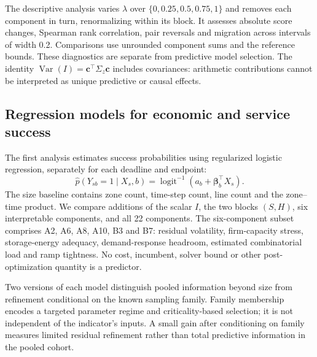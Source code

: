 The descriptive analysis varies $\lambda$ over $\{0,0.25,0.5,0.75,1\}$ and
removes each component in turn, renormalizing within its block. It assesses
absolute score changes, Spearman rank correlation, pair reversals and
migration across intervals of width 0.2. Comparisons use unrounded component
sums and the reference bounds. These diagnostics are separate from
predictive model selection. The identity
$\operatorname{Var}(I)=\boldsymbol c^\top\Sigma_z\boldsymbol c$ includes
covariances: arithmetic contributions cannot be interpreted as unique
predictive or causal effects.

\subsection{Regression models for economic and service success}
\label{sec:binary_models}
The first analysis estimates success probabilities using regularized
logistic regression, separately for each deadline and endpoint:
\begin{equation}
 \widehat p(Y_{sb}=1\mid X_s,b)
 =\operatorname{logit}^{-1}(a_b+\boldsymbol\beta_b^\top X_s).
\end{equation}
The size baseline contains zone count, time-step count, line count and the
zone--time product. We compare additions of the scalar $I$, the two blocks
$(S,H)$, six interpretable components, and all 22 components. The
six-component subset comprises A2, A6, A8, A10, B3 and B7: residual
volatility, firm-capacity stress, storage-energy adequacy, demand-response
headroom, estimated combinatorial load and ramp tightness. No cost,
incumbent, solver bound or other post-optimization quantity is a predictor.

Two versions of each model distinguish pooled information beyond size from
refinement conditional on the known sampling family. Family membership
encodes a targeted parameter regime and criticality-based selection; it is
not independent of the indicator's inputs. A small gain after conditioning
on family measures limited residual refinement rather than total predictive
information in the pooled cohort.


